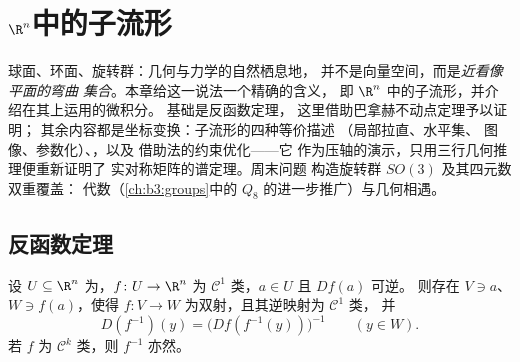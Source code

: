 \chapter{\texorpdfstring{$\R^n$}{Rn}中的子流形}
\label{ch:b3:submanifolds}

球面、环面、旋转群：几何与力学的自然栖息地，
并不是向量空间，而是\emph{近看像平面的弯曲
集合}。本章给这一说法一个精确的含义，
即 $\R^n$ 中的子流形，并介绍在其上运用的微积分。
基础是反函数定理，
这里借助巴拿赫不动点定理予以证明；
其余内容都是坐标变换：子流形的四种等价描述
（局部拉直、水平集、
图像、参数化）、，以及
借助法的约束优化——它
作为压轴的演示，只用三行几何推理便重新证明了
实对称矩阵的谱定理。周末问题
构造旋转群 $SO(3)$ 及其四元数双重覆盖：
代数（\cref{ch:b3:groups}中的
$Q_8$ 的进一步推广）与几何相遇。

\section{反函数定理}

\begin{theorem}[反函数定理]
\label{thm:b3:submanifolds:ift}
设 $U \subseteq \R^n$ 为，$f \colon U \to \R^n$ 为
$\mathcal C^1$ 类，$a \in U$ 且 $Df(a)$ 可逆。
则存在 $V \ni a$、$W \ni f(a)$，使得
$f \colon V \to W$ 为双射，且其逆映射为 $\mathcal C^1$ 类，
并
\[
D(f^{-1})(y) = \bigl(Df(f^{-1}(y))\bigr)^{-1}
\qquad (y \in W).
\]
若 $f$ 为 $\mathcal C^k$ 类，则 $f^{-1}$ 亦然。
\end{theorem}


